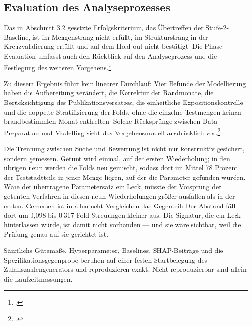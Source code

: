 \documentclass[12pt,a4paper]{article}
\begin{document}


\subsection{Evaluation des Analyseprozesses}

 
Das in Abschnitt 3.2 gesetzte Erfolgskriterium, das Übertreffen der Stufe-2-Baseline, ist im Mengenstrang nicht erfüllt, im Strukturstrang in der Kreuzvalidierung erfüllt und auf dem Hold-out nicht bestätigt. Die Phase Evaluation umfasst auch den Rückblick auf den Analyseprozess und die Festlegung des weiteren Vorgehens.\footcite[30-31]{Chapman2000}
 
Zu diesem Ergebnis führt kein linearer Durchlauf: Vier Befunde der Modellierung haben die Aufbereitung verändert, die Korrektur der Randmonate, die Berücksichtigung des Publikationsversatzes, die einheitliche Expositionskontrolle und die doppelte Stratifizierung der Folds, ohne die einzelne Testmengen keinen brandbestimmten Monat enthielten. Solche Rücksprünge zwischen Data Preparation und Modelling sieht das Vorgehensmodell ausdrücklich vor.\footcite[13]{Chapman2000}

Die Trennung zwischen Suche und Bewertung ist nicht nur konstruktiv gesichert, sondern gemessen. Getunt wird einmal, auf der ersten Wiederholung; in den übrigen neun werden die Folds neu gemischt, sodass dort im Mittel 78 Prozent der Teststadtteile in jener Menge liegen, auf der die Parameter gefunden wurden. Wäre der übertragene Parametersatz ein Leck, müsste der Vorsprung der getunten Verfahren in diesen neun Wiederholungen größer ausfallen als in der ersten. Gemessen ist in allen acht Vergleichen das Gegenteil: Der Abstand fällt dort um 0,098 bis 0,317 Fold-Streuungen kleiner aus. Die Signatur, die ein Leck hinterlassen würde, ist damit nicht vorhanden — und sie wäre sichtbar, weil die Prüfung genau auf sie gerichtet ist.
 
Sämtliche Gütemaße, Hyperparameter, Baselines, SHAP-Beiträge und die Spezifikationsgegenprobe beruhen auf einer festen Startbelegung des Zufallszahlengenerators und reproduzieren exakt. Nicht reproduzierbar sind allein die Laufzeitmessungen.
 
\end{document}
